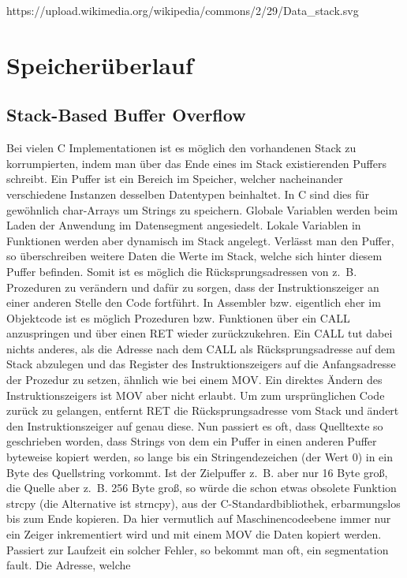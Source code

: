 ﻿\documentclass[12pt]{book}
\begin{document}
https://upload.wikimedia.org/wikipedia/commons/2/29/Data_stack.svg

\section{Speicherüberlauf}

\subsection{Stack-Based Buffer Overflow}
Bei vielen C Implementationen ist es möglich den vorhandenen Stack zu
korrumpierten, indem man über das Ende eines im Stack existierenden Puffers
schreibt. Ein Puffer ist ein Bereich im Speicher, welcher nacheinander
verschiedene Instanzen desselben Datentypen beinhaltet. In C sind dies für
gewöhnlich char-Arrays um Strings zu speichern. Globale Variablen werden beim
Laden der Anwendung im Datensegment angesiedelt. Lokale Variablen in Funktionen
werden aber dynamisch im Stack angelegt. Verlässt man den Puffer, so
überschreiben weitere Daten die Werte im Stack, welche sich hinter diesem Puffer
befinden. Somit ist es möglich die Rücksprungsadressen von z. B. Prozeduren zu
verändern und dafür zu sorgen, dass der Instruktionszeiger an einer anderen
Stelle den Code fortführt. In Assembler bzw. eigentlich eher im Objektcode ist
es möglich Prozeduren bzw. Funktionen über ein CALL anzuspringen und über einen
RET wieder zurückzukehren. Ein CALL tut dabei nichts anderes, als die Adresse
nach dem CALL als Rücksprungsadresse auf dem Stack abzulegen und das Register
des Instruktionszeigers auf die Anfangsadresse der Prozedur zu setzen, ähnlich
wie bei einem MOV. Ein direktes Ändern des Instruktionszeigers ist MOV aber
nicht erlaubt. Um zum ursprünglichen Code zurück zu gelangen, entfernt RET die
Rücksprungsadresse vom Stack und ändert den Instruktionszeiger auf genau
diese. Nun passiert es oft, dass Quelltexte so geschrieben worden, dass Strings
von dem ein Puffer in einen anderen Puffer byteweise kopiert werden, so lange
bis ein Stringendezeichen (der Wert 0) in ein Byte des Quellstring vorkommt.
Ist der Zielpuffer z. B. aber nur 16 Byte groß, die Quelle aber z. B. 256 Byte
groß, so würde die schon etwas obsolete Funktion strcpy (die Alternative ist
strncpy), aus der C-Standardbibliothek, erbarmungslos bis zum Ende kopieren.
Da hier vermutlich auf Maschinencodeebene immer nur ein Zeiger inkrementiert
wird und mit einem MOV die Daten kopiert werden. Passiert zur Laufzeit ein
solcher Fehler, so bekommt man oft, ein segmentation fault. Die Adresse, welche
\end{document}
